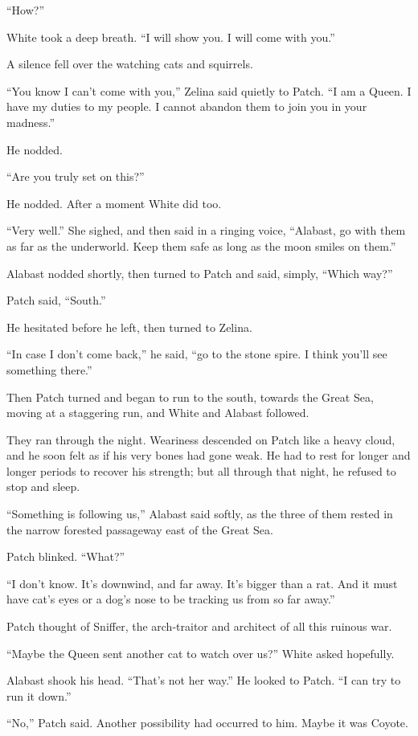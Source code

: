 \documentclass[ebook,oneside,openany,12pt]{memoir}
\begin{document}
“How?”

White took a deep breath. “I will show you. I will come with you.”

A silence fell over the watching cats and squirrels.

“You know I can’t come with you,” Zelina said quietly to Patch. “I am
a Queen. I have my duties to my people. I cannot abandon them to join
you in your madness.”

He nodded.

“Are you truly set on this?”

He nodded. After a moment White did too.

“Very well.” She sighed, and then said in a ringing voice, “Alabast,
go with them as far as the underworld. Keep them safe as long as the
moon smiles on them.”

Alabast nodded shortly, then turned to Patch and said, simply, “Which
way?”

Patch said, “South.”

He hesitated before he left, then turned to Zelina.

“In case I don’t come back,” he said, “go to the stone spire. I think
you’ll see something there.”

Then Patch turned and began to run to the south, towards the Great
Sea, moving at a staggering run, and White and Alabast followed.

They ran through the night. Weariness descended on Patch like a heavy
cloud, and he soon felt as if his very bones had gone weak. He had to
rest for longer and longer periods to recover his strength; but all
through that night, he refused to stop and sleep.

“Something is following us,” Alabast said softly, as the three of them
rested in the narrow forested passageway east of the Great Sea.

Patch blinked. “What?”

“I don’t know. It’s downwind, and far away. It’s bigger than a
rat. And it must have cat’s eyes or a dog’s nose to be tracking us
from so far away.”

Patch thought of Sniffer, the arch-traitor and architect of all this
ruinous war.

“Maybe the Queen sent another cat to watch over us?” White asked
hopefully.

Alabast shook his head. “That’s not her way.” He looked to Patch. “I
can try to run it down.”

“No,” Patch said. Another possibility had occurred to him. Maybe it
was Coyote.
\end{document}

